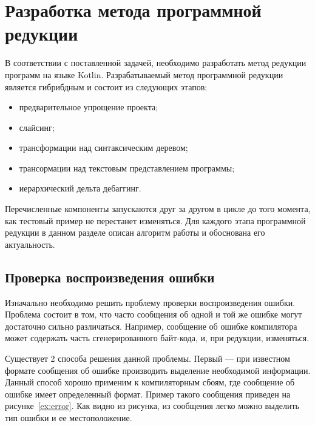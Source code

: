 \chapter{Разработка метода программной редукции}
В соответствии с поставленной задачей, необходимо разработать метод редукции программ на языке Kotlin.
Разрабатываемый метод программной редукции является гибрибдным и состоит из следующих этапов: 
\begin{itemize}
	\item предварительное упрощение проекта;
	\item слайсинг;
	\item трансформации над синтаксическим деревом;
	\item трансормации над текстовым представлением программы;
	\item иерархический дельта дебаггинг.
\end{itemize}
Перечисленные компоненты запускаются друг за другом в цикле до того момента, как тестовый пример не перестанет изменяться. Для каждого этапа программной редукции в данном разделе описан алгоритм работы и обоснована его актуальность.

\section{Проверка воспроизведения ошибки}
Изначально необходимо решить проблему проверки воспроизведения ошибки. Проблема состоит в том, что часто сообщения об одной и той же ошибке могут достаточно сильно различаться. Например, сообщение об ошибке компилятора может содержать часть сгенерированного байт-кода, и, при редукции, изменяться. 

Существует 2 способа решения данной проблемы. Первый --- при известном формате сообщения об ошибке производить выделение необходимой информации. Данный способ хорошо применим к компиляторным сбоям, где сообщение об ошибке имеет определенный формат. Пример такого сообщения приведен на рисунке~\ref{ex:error}. Как видно из рисунка, из сообщения легко можно выделить тип ошибки и ее местоположение.
\begin{figure}
\end{figure} 

